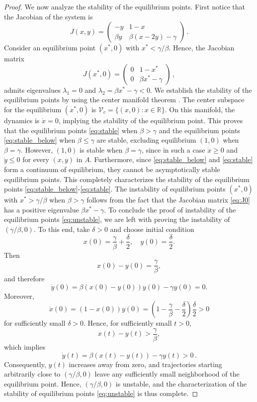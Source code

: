 \documentclass{article}
\begin{document}
\begin{proof}
We now analyze the stability of the equilibrium points. First notice that the Jacobian of the system is
$$J(x,y) = \begin{pmatrix}
	-y & 1-x \\
	\beta y & \beta(x-2y) - \gamma
\end{pmatrix}\,.$$
Consider an equilibrium point $(x^*,0)$ with $x^* < \gamma/\beta$. Hence, the Jacobian matrix
\begin{equation}\label{eq:J0}
J(x^*,0) = \begin{pmatrix}
    0 & 1 - x^* \\
    0 & \beta x^* - \gamma
\end{pmatrix}\,,
\end{equation}
admits eigenvalues $\lambda_1 = 0$ and $\lambda_2 = \beta x^* - \gamma < 0$. We establish the stability of the equilibrium points by using the center manifold theorem \cite[Section 3.2]{Guckenheimer1983}. The center subspace for the equilibrium $(x^*,0)$ is $\mathcal V_c = \{(x,0): x \in \mathbb R\}$.
On this manifold, the dynamics is $\dot{x}=0$, implying the stability of the equilibrium point. This proves that the equilibrium points \eqref{eq:stable} when $\beta > \gamma$ and the equilibrium points \eqref{eq:stable_below} when $\beta \le \gamma$ are stable, excluding equilibrium $(1,0)$ when $\beta = \gamma$. However, $(1,0)$ is stable when $\beta = \gamma$, since in such a case $\dot x \ge 0$ and $\dot y \le 0$ for every $(x,y)$ in $A$. Furthermore, since \eqref{eq:stable_below} and \eqref{eq:stable} form a continuum of equilibrium, they cannot be asymptotically stable equilibrium points. This completely characterizes the stability of the equilibrium points \eqref{eq:stable_below}-\eqref{eq:stable}.
The instability of equilibrium points $(x^*,0)$ with $x^* > \gamma /\beta$ when $\beta > \gamma$ follows from the fact that the Jacobian matrix \eqref{eq:J0} has a positive eigenvalue $\beta x^* - \gamma$.
To conclude the proof of instability of the equilibrium points \eqref{eq:unstable},
we are left with proving the instability of $(\gamma/\beta,0)$. To this end, take $\delta>0$ and choose initial condition
$$
x(0)=\frac\gamma\beta+\frac{\delta}{2}, \quad y(0)=\frac{\delta}{2}.
$$
Then
$$
x(0)-y(0)=\frac{\gamma}{\beta},
$$
and therefore
$$
\dot y(0)
=
\beta(x(0)-y(0))y(0)-\gamma y(0)
=0.
$$
Moreover,
$$
\dot x(0)
=
(1-x(0))y(0)
=
\left(1-\frac{\gamma}{\beta}-\frac{\delta}{2}\right)\frac{\delta}{2}>0
$$
for sufficiently small $\delta>0$. Hence, for sufficiently small $t>0$,
$$
x(t)-y(t)>\frac{\gamma}{\beta},
$$
which implies
$$
\dot y(t) =\beta(x(t)-y(t))-\gamma y(t)>0\,.
$$
Consequently, $y(t)$ increases away from zero, and trajectories starting arbitrarily close to $(\gamma/\beta,0)$ leave any sufficiently small neighborhood of the equilibrium point. Hence, $(\gamma/\beta,0)$ is unstable, and the characterization of the stability of equilibrium points \eqref{eq:unstable} is thus complete.
        

\end{proof}
\end{document}
